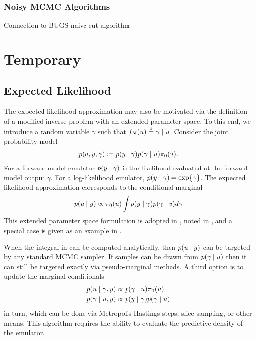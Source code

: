 \documentclass[12pt]{article}
\begin{document}
\subsubsection{Noisy MCMC Algorithms}
Connection to BUGS naive cut algorithm



\section{Temporary}
\subsection{Expected Likelihood}
The expected likelihood approximation may also be motivated via the definition of a modified 
inverse problem with an extended parameter space. To this end, we introduce a random variable
$\gamma$ such that $\funcEm[\Ndesign](\Par) \overset{\mathrm{d}}{=} \gamma \given \Par$.
Consider the joint probability model 
\begin{align}
p(\Par, \obs, \gamma) \Def 
p(\obs \given \gamma) p(\gamma \given \Par) \priorDens(\Par). \label{eq:EL-prob-model}
\end{align}
For a forward model emulator $p(\obs \given \gamma)$ is the likelihood evaluated at
the forward model output $\gamma$. For a log-likelihood emulator, 
$p(\obs \given \gamma) = \Exp{\gamma}$. The expected likelihood approximation 
corresponds to the conditional marginal 
\begin{align}
p(\Par \given \obs) \propto \priorDens(\Par) \int p(\obs \given \gamma) p(\gamma \given \Par) d\gamma
\label{eq:EL-marginal}
\end{align}
This extended parameter space formulation is adopted in \citet{BilionisBayesSurrogates}, noted in
\citet{SinsbeckNowak}, and a special case is given as an example in \citet{StuartTeck2}.

When the integral in  can be computed analytically, then $p(\Par \given \obs)$ can 
be targeted by any standard MCMC sampler. If samples can be drawn from $p(\gamma \given \Par)$ then
it can still be targeted exactly via pseudo-marginal methods. A third option is to update the marginal conditionals
\begin{align}
p(\Par \given \gamma, \obs) &\propto p(\gamma \given \Par) \priorDens(\Par) \label{eq:EL-conditionals} \\
p(\gamma \given \Par, \obs) &\propto p(\obs \given \gamma) p(\gamma \given \Par)
\end{align}
in turn, which can be done via Metropolis-Hastings steps, slice sampling, or other means. This algorithm
requires the ability to evaluate the predictive density of the emulator.
\end{document}
